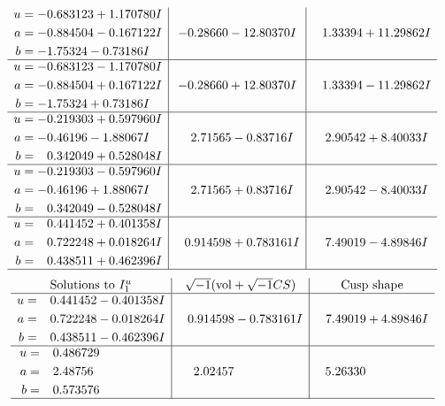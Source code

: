 \documentclass[1p]{elsarticle_modified}
\theoremstyle{definition}
\newcommand{\I}{\sqrt{-1}}
\begin{document}
$$\begin{array}{c|c|c}
\begin{aligned}
u &= -0.683123 + 1.170780 I \\
a &= -0.884504 - 0.167122 I \\
b &= -1.75324 - 0.73186 I\end{aligned}
 & -0.28660 - 12.80370 I & \phantom{-}1.33394 + 11.29862 I \\ \hline\begin{aligned}
u &= -0.683123 - 1.170780 I \\
a &= -0.884504 + 0.167122 I \\
b &= -1.75324 + 0.73186 I\end{aligned}
 & -0.28660 + 12.80370 I & \phantom{-}1.33394 - 11.29862 I \\ \hline\begin{aligned}
u &= -0.219303 + 0.597960 I \\
a &= -0.46196 - 1.88067 I \\
b &= \phantom{-}0.342049 + 0.528048 I\end{aligned}
 & \phantom{-}2.71565 - 0.83716 I & \phantom{-}2.90542 + 8.40033 I \\ \hline\begin{aligned}
u &= -0.219303 - 0.597960 I \\
a &= -0.46196 + 1.88067 I \\
b &= \phantom{-}0.342049 - 0.528048 I\end{aligned}
 & \phantom{-}2.71565 + 0.83716 I & \phantom{-}2.90542 - 8.40033 I \\ \hline\begin{aligned}
u &= \phantom{-}0.441452 + 0.401358 I \\
a &= \phantom{-}0.722248 + 0.018264 I \\
b &= \phantom{-}0.438511 + 0.462396 I\end{aligned}
 & \phantom{-}0.914598 + 0.783161 I & \phantom{-}7.49019 - 4.89846 I\\
 \hline 
 \end{array}$$\newpage$$\begin{array}{c|c|c}  
\text{Solutions to }I^u_{1}& \I (\text{vol} + \sqrt{-1}CS) & \text{Cusp shape}\\
 \hline 
\begin{aligned}
u &= \phantom{-}0.441452 - 0.401358 I \\
a &= \phantom{-}0.722248 - 0.018264 I \\
b &= \phantom{-}0.438511 - 0.462396 I\end{aligned}
 & \phantom{-}0.914598 - 0.783161 I & \phantom{-}7.49019 + 4.89846 I \\ \hline\begin{aligned}
u &= \phantom{-}0.486729\phantom{ +0.000000I} \\
a &= \phantom{-}2.48756\phantom{ +0.000000I} \\
b &= \phantom{-}0.573576\phantom{ +0.000000I}\end{aligned}
 & \phantom{-}2.02457\phantom{ +0.000000I} & \phantom{-}5.26330\phantom{ +0.000000I}\\
 \hline 
 \end{array}$$\newpage\newpage\renewcommand{\arraystretch}{1}
\end{document}
